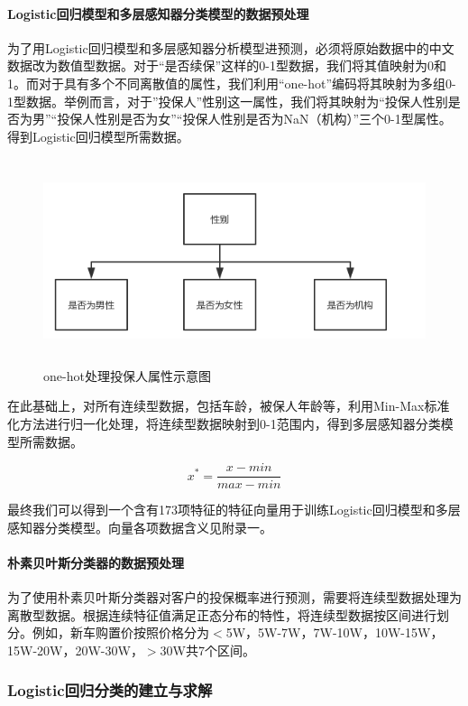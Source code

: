\documentclass[UTF8,12pt,songti]{ctexart}
\begin{document}
\paragraph{Logistic回归模型和多层感知器分类模型的数据预处理}\quad \par
为了用Logistic回归模型和多层感知器分析模型进预测，必须将原始数据中的中文数据改为数值型数据。对于“是否续保”这样的0-1型数据，我们将其值映射为0和1。而对于具有多个不同离散值的属性，我们利用“one-hot”编码将其映射为多组0-1型数据。举例而言，对于”投保人”性别这一属性，我们将其映射为“投保人性别是否为男”“投保人性别是否为女”“投保人性别是否为NaN（机构）”三个0-1型属性。得到Logistic回归模型所需数据。
\begin{figure}[H]
\centering
\includegraphics[width=14cm,height=6cm]{4-1-2-1.png}
\caption{one-hot处理投保人属性示意图}
\end{figure}
\par 在此基础上，对所有连续型数据，包括车龄，被保人年龄等，利用Min-Max标准化方法进行归一化处理，将连续型数据映射到0-1范围内，得到多层感知器分类模型所需数据。\par
\begin{equation}\label{min-max}
 x^{*}=\frac{x-min}{max-min}
\end{equation}
\quad \par 最终我们可以得到一个含有173项特征的特征向量用于训练Logistic回归模型和多层感知器分类模型。向量各项数据含义见附录一。
\paragraph{朴素贝叶斯分类器的数据预处理} \qquad  \par
为了使用朴素贝叶斯分类器对客户的投保概率进行预测，需要将连续型数据处理为离散型数据。根据连续特征值满足正态分布的特性，将连续型数据按区间进行划分。例如，新车购置价按照价格分为$<$5W，5W-7W，7W-10W，10W-15W，15W-20W，20W-30W，$>$30W共7个区间。
\subsubsection{Logistic回归分类的建立与求解}
\end{document}

